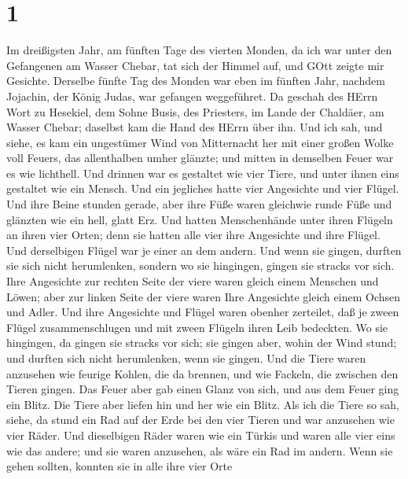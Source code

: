 \hypertarget{section}{%
\section{1}\label{section}}

 Im dreißigsten Jahr, am fünften Tage des vierten Monden, da
ich war unter den Gefangenen am Wasser Chebar, tat sich der Himmel auf,
und GOtt zeigte mir Gesichte.  Derselbe fünfte Tag des
Monden war eben im fünften Jahr, nachdem Jojachin, der König Judas, war
gefangen weggeführet.  Da geschah des HErrn Wort zu
Hesekiel, dem Sohne Busis, des Priesters, im Lande der Chaldäer, am
Wasser Chebar; daselbst kam die Hand des HErrn über ihn. 
Und ich sah, und siehe, es kam ein ungestümer Wind von Mitternacht her
mit einer großen Wolke voll Feuers, das allenthalben umher glänzte; und
mitten in demselben Feuer war es wie lichthell.  Und drinnen
war es gestaltet wie vier Tiere, und unter ihnen eins gestaltet wie ein
Mensch.  Und ein jegliches hatte vier Angesichte und vier
Flügel.  Und ihre Beine stunden gerade, aber ihre Füße waren
gleichwie runde Füße und glänzten wie ein hell, glatt Erz. 
Und hatten Menschenhände unter ihren Flügeln an ihren vier Orten; denn
sie hatten alle vier ihre Angesichte und ihre Flügel.  Und
derselbigen Flügel war je einer an dem andern. Und wenn sie gingen,
durften sie sich nicht herumlenken, sondern wo sie hingingen, gingen sie
stracks vor sich.  Ihre Angesichte zur rechten Seite der
viere waren gleich einem Menschen und Löwen; aber zur linken Seite der
viere waren Ihre Angesichte gleich einem Ochsen und Adler. 
Und ihre Angesichte und Flügel waren obenher zerteilet, daß je zween
Flügel zusammenschlugen und mit zween Flügeln ihren Leib bedeckten.
 Wo sie hingingen, da gingen sie stracks vor sich; sie
gingen aber, wohin der Wind stund; und durften sich nicht herumlenken,
wenn sie gingen.  Und die Tiere waren anzusehen wie feurige
Kohlen, die da brennen, und wie Fackeln, die zwischen den Tieren gingen.
Das Feuer aber gab einen Glanz von sich, und aus dem Feuer ging ein
Blitz.  Die Tiere aber liefen hin und her wie ein Blitz.
 Als ich die Tiere so sah, siehe, da stund ein Rad auf der
Erde bei den vier Tieren und war anzusehen wie vier Räder. 
Und dieselbigen Räder waren wie ein Türkis und waren alle vier eins wie
das andere; und sie waren anzusehen, als wäre ein Rad im andern.
 Wenn sie gehen sollten, konnten sie in alle ihre vier Orte

